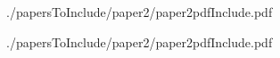 
 {./papersToInclude/paper2/paper2pdfInclude.pdf}

 {./papersToInclude/paper2/paper2pdfInclude.pdf} 
